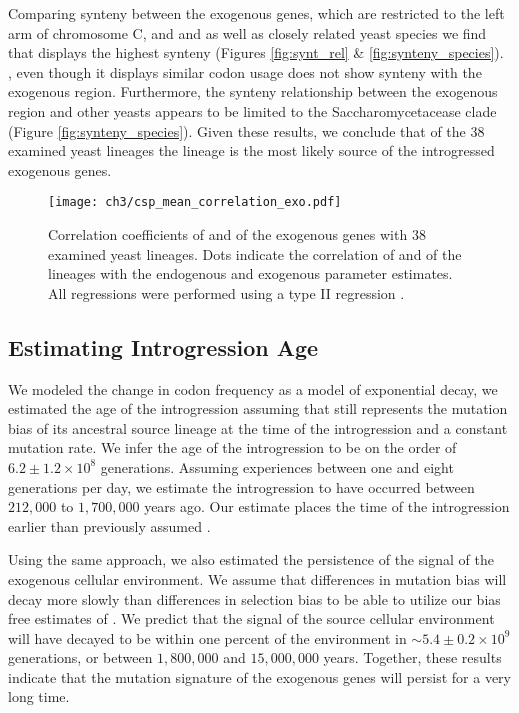 Comparing synteny between the exogenous genes, which are restricted to the left arm of chromosome C, and \gossypii and \dubl as well as closely related yeast species we find that \gossypii displays the highest synteny (Figures \ref{fig:synt_rel} \& \ref{fig:synteny_species}).
\dubl, even though it displays similar codon usage does not show synteny with the exogenous region.
Furthermore, the synteny relationship between the exogenous region and other yeasts appears to be limited to the Saccharomycetacease clade (Figure \ref{fig:synteny_species}).
Given these results, we conclude that of the 38 examined yeast lineages the \gossypii lineage is the most likely source of the introgressed exogenous genes.

\singlespacing
\begin{figure}
     \centering
	\texttt{[image: ch3/csp\_mean\_correlation\_exo.pdf]}
	\caption{Correlation coefficients of \DM and \DE of the exogenous genes with 38 examined yeast lineages. 
	Dots indicate the correlation of \DM and \DE of the lineages with the endogenous and exogenous parameter estimates. 
	All regressions were performed using a type II regression \citep{SokalAndRohlf1981}.}
	\label{fig:csp_exo_comp}
\end{figure}
\doublespacing

\subsection{Estimating Introgression Age}

We modeled the change in codon frequency as a model of exponential decay, we estimated the age of the introgression assuming that \gossypii still represents the mutation bias of its ancestral source lineage at the time of the introgression and a constant mutation rate.
We infer the age of the introgression to be on the order of $6.2\pm1.2\times 10^8$ generations. 
Assuming \kluyveri experiences between one and eight generations per day, we estimate the introgression to have occurred between $212,000$ to $1,700,000$ years ago.
Our estimate places the time of the introgression earlier than previously assumed \citep{friedrich2015}.

Using the same approach, we also estimated the persistence of the signal of the exogenous cellular environment.
We assume that differences in mutation bias will decay more slowly than differences in selection bias to be able to utilize our bias free estimates of \DM.
We predict that the \DM signal of the source cellular environment will have decayed to be within one percent of the \kluyveri environment in $\sim 5.4\pm0.2\times 10^9 $ generations, or between $1,800,000$ and $15,000,000$ years.
Together, these results indicate that the mutation signature of the exogenous genes will persist for a very long time.

